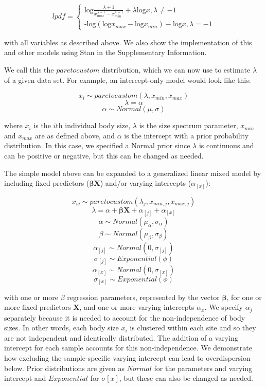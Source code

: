 \documentclass[
  12pt,
]{article}
\numberwithin{equation}
\begin{document}
\[
 lpdf = \begin{cases}\text{log}\frac{\lambda + 1}{{x_{max}^{\lambda+1}} - {x_{min}^{\lambda+1}}} + \lambda\text{log}x, \lambda \neq-1 \\
\text{-log}({{\text{log}x_{max}} - {\text{log}x_{min}}}) -\text{log}x, \lambda = -1\end{cases}
\]

with all variables as described above. We also show the implementation
of this and other models using Stan in the Supplementary Information.

We call this the \(paretocustom\) distribution, which we can now use to
estimate \(\lambda\) of a given data set. For example, an intercept-only
model would look like this:

\[x_i \sim paretocustom(\lambda, x_{min}, x_{max})\]
\[\lambda = \alpha\] \[\alpha \sim Normal(\mu, \sigma)\]

where \(x_i\) is the \(i\)th individual body size, \(\lambda\) is the
size spectrum parameter, \(x_{min}\) and \(x_{max}\) are as defined
above, and \(\alpha\) is the intercept with a prior probability
distribution. In this case, we specified a Normal prior since
\(\lambda\) is continuous and can be positive or negative, but this can
be changed as needed.

The simple model above can be expanded to a generalized linear mixed
model by including fixed predictors (\(\boldsymbol\beta \textbf{X}\))
and/or varying intercepts (\(\alpha_{[x]}\)):

\[x_{ij} \sim paretocustom(\lambda_j, x_{min, j}, x_{max, j})\]
\[\lambda = \alpha + \boldsymbol\beta \textbf{X} + \alpha_{[j]} + \alpha_{[x]}\]
\[\alpha \sim Normal(\mu_{\alpha}, \sigma_{\alpha})\]
\[\beta \sim Normal(\mu_{\beta},\sigma_{\beta})\]
\[\alpha_{[j]} \sim Normal(0, \sigma_{[j]})\]
\[\sigma_{[j]} \sim Exponential(\phi)\]
\[\alpha_{[x]} \sim Normal(0, \sigma_{[x]})\]
\[\sigma_{[x]} \sim Exponential(\phi)\]

with one or more \(\beta\) regression parameters, represented by the
vector \(\boldsymbol\beta\), for one or more fixed predictors
\(\textbf{X}\), and one or more varying intercepts \(\alpha_x\). We
specify \(\alpha_{j}\) separately because it is needed to account for
the non-independence of body sizes. In other words, each body size
\(x_i\) is clustered within each site and so they are not independent
and identically distributed. The addition of a varying intercept for
each sample accounts for this non-independence. We demonstrate how
excluding the sample-specific varying intercept can lead to
overdispersion below. Prior distributions are given as \(Normal\) for
the parameters and varying intercept and \(Exponential\) for
\(\sigma{[x]}\), but these can also be changed as needed.
\end{document}
